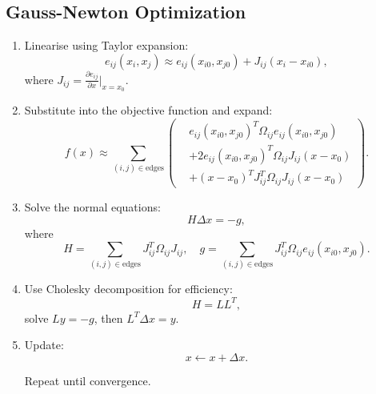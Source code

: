 \subsection{Gauss-Newton Optimization}

\begin{enumerate}
    \item Linearise using Taylor expansion:
    \[
    e_{ij}(x_{i}, x_{j}) \approx e_{ij}(x_{i0}, x_{j0}) + J_{ij}(x_{i} - x_{i0}),
    \]
    where \(J_{ij} = \frac{\partial e_{ij}}{\partial x}\bigg|_{x=x_{0}}\).

    \item Substitute into the objective function and expand:
    \[
    f(x) \approx \sum_{(i,j) \in \text{edges}} 
    \left(
    \begin{aligned}
        & e_{ij}(x_{i0}, x_{j0})^{T} \Omega_{ij} e_{ij}(x_{i0}, x_{j0}) \\
        & + 2 e_{ij}(x_{i0}, x_{j0})^{T} \Omega_{ij} J_{ij} (x - x_0) \\
        & + (x - x_0)^{T} J_{ij}^{T} \Omega_{ij} J_{ij} (x - x_0)
    \end{aligned}
    \right).
    \]

    \item Solve the normal equations:
    \[
    H \Delta x = -g,
    \]
    where
    \[
    H = \sum_{(i,j) \in \text{edges}} J_{ij}^{T} \Omega_{ij} J_{ij}, \quad g = \sum_{(i,j) \in \text{edges}} J_{ij}^{T} \Omega_{ij} e_{ij}(x_{i0}, x_{j0}).
    \]

    \item Use Cholesky decomposition for efficiency:
    \[
    H = L L^{T},
    \]
    solve \(L y = -g\), then \(L^{T} \Delta x = y\).

    \item Update:
    \[
    x \leftarrow x + \Delta x.
    \]

    Repeat until convergence.
\end{enumerate}